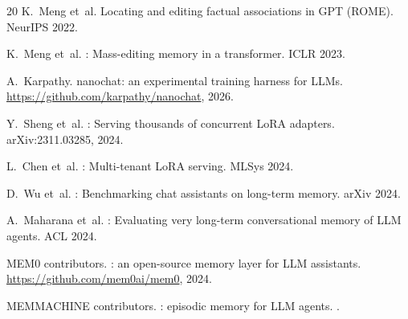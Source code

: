 \documentclass{article}
\begin{document}
\begin{thebibliography}{20}
K.~Meng et~al.
\newblock Locating and editing factual associations in {GPT} ({ROME}).
\newblock NeurIPS 2022.

K.~Meng et~al.
: Mass-editing memory in a transformer.
\newblock ICLR 2023.

A.~Karpathy.
\newblock nanochat: an experimental training harness for LLMs.
\newblock \url{https://github.com/karpathy/nanochat}, 2026.

Y.~Sheng et~al.
: Serving thousands of concurrent {LoRA} adapters.
\newblock arXiv:2311.03285, 2024.

L.~Chen et~al.
: Multi-tenant {LoRA} serving.
\newblock MLSys 2024.

D.~Wu et~al.
: Benchmarking chat assistants on long-term memory.
\newblock arXiv 2024.

A.~Maharana et~al.
: Evaluating very long-term conversational memory of {LLM}
  agents.
\newblock ACL 2024.

{MEM0 contributors}.
: an open-source memory layer for {LLM} assistants.
\newblock \url{https://github.com/mem0ai/mem0}, 2024.

{MEMMACHINE contributors}.
: episodic memory for {LLM} agents.
.

\end{thebibliography}
\end{document}
